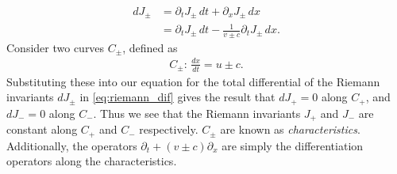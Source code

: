 \begin{align}
    d J_\pm &= \partial_t J_\pm \, dt + \partial_x J_\pm \, dx \\
    &= \partial_t J_\pm \, dt - \frac{1}{v \pm c} \partial_t J_\pm \, dx. \label{eq:riemann_dif}
\end{align}
Consider two curves $C_\pm$, defined as 
\begin{align}
    C_\pm: \, \frac{dx}{dt} = u \pm c.
\end{align}
Substituting these into our equation for the total differential of the Riemann invariants $dJ_\pm$ in \ref{eq:riemann_dif} gives the result that $dJ_+ = 0$ along $C_+$, and $dJ_- = 0$ along $C_-$.
Thus we see that the Riemann invariants $J_+$ and $J_-$ are constant along $C_+$ and $C_-$ respectively.
$C_\pm$ are known as \textit{characteristics}.
Additionally, the operators $\partial_t + (v \pm c)\partial_x$ are simply the differentiation operators along the characteristics.